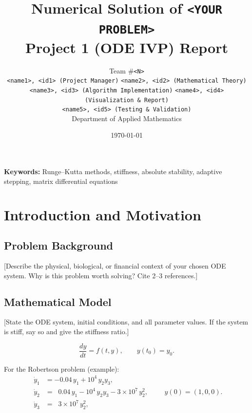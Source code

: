 \documentclass[11pt,a4paper]{article}
\title{\textbf{Numerical Solution of \texttt{<YOUR PROBLEM>}}\\[2mm]
\large Project 1 (ODE IVP) Report}
\author{
    Team \#\texttt{<N>} \\
    \small \texttt{<name1>, <id1> (Project Manager)} \quad
    \texttt{<name2>, <id2> (Mathematical Theory)} \\
    \small \texttt{<name3>, <id3> (Algorithm Implementation)} \quad
    \texttt{<name4>, <id4> (Visualization \& Report)} \\
    \small \texttt{<name5>, <id5> (Testing \& Validation)} \\
    \small Department of Applied Mathematics
}
\date{\today}
\theoremstyle{definition}
\theoremstyle{remark}
\begin{document}
\maketitle

\begin{abstract}
\end{abstract}

\noindent\textbf{Keywords:} Runge--Kutta methods, stiffness, absolute stability,
adaptive stepping, matrix differential equations

\tableofcontents
\newpage

\section{Introduction and Motivation}

\subsection{Problem Background}
[Describe the physical, biological, or financial context of your chosen ODE
system. Why is this problem worth solving? Cite 2--3 references.]

\subsection{Mathematical Model}
[State the ODE system, initial conditions, and all parameter values. If the
system is stiff, say so and give the stiffness ratio.]

\begin{equation}
    \frac{dy}{dt} = f(t, y), \qquad y(t_0) = y_0.
    \label{eq:ivp}
\end{equation}

For the Robertson problem (example):
\begin{equation}
\begin{aligned}
    \dot{y}_1 &= -0.04\, y_1 + 10^4\, y_2 y_3, \\
    \dot{y}_2 &= \;\;0.04\, y_1 - 10^4\, y_2 y_3 - 3\times 10^7\, y_2^2, \\
    \dot{y}_3 &= \;\;3\times 10^7\, y_2^2,
\end{aligned}
\qquad y(0) = (1, 0, 0).
\label{eq:robertson}
\end{equation}
\end{document}
